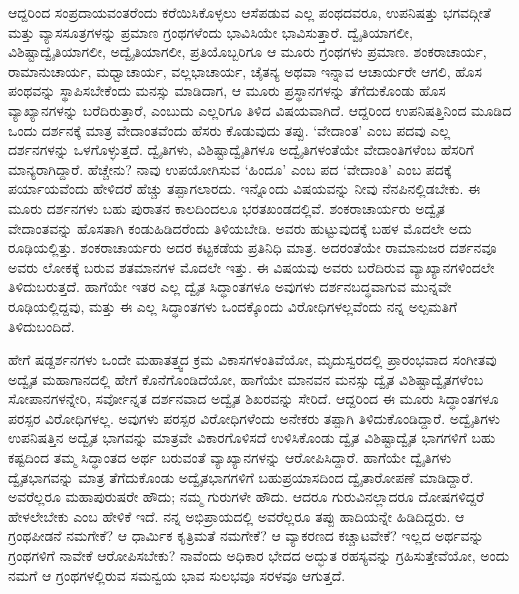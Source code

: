 ಆದ್ದರಿಂದ ಸಂಪ್ರದಾಯವಂತರೆಂದು ಕರೆಯಿಸಿಕೊಳ್ಳಲು ಆಸೆಪಡುವ ಎಲ್ಲ ಪಂಥದವರೂ, ಉಪನಿಷತ್ತು ಭಗವದ್ಗೀತೆ ಮತ್ತು ವ್ಯಾಸಸೂತ್ರಗಳನ್ನು ಪ್ರಮಾಣ ಗ್ರಂಥಗಳೆಂದು ಭಾವಿಸಿಯೇ ಭಾವಿಸುತ್ತಾರೆ. ದ್ವೈತಿಯಾಗಲೀ, ವಿಶಿಷ್ಟಾದ್ವೈತಿಯಾಗಲೀ, ಅದ್ವೈತಿಯಾಗಲೀ, ಪ್ರತಿಯೊಬ್ಬರಿಗೂ ಆ ಮೂರು ಗ್ರಂಥಗಳು ಪ್ರಮಾಣ. ಶಂಕರಾಚಾರ್ಯ, ರಾಮಾನುಚಾರ್ಯ, ಮಧ್ವಾಚಾರ್ಯ, ವಲ್ಲಭಾಚಾರ್ಯ, ಚೈತನ್ಯ ಅಥವಾ ಇನ್ನಾವ ಆಚಾರ್ಯರೇ ಆಗಲಿ, ಹೊಸ ಪಂಥವನ್ನು ಸ್ಥಾಪಿಸಬೇಕೆಂದು ಮನಸ್ಸು ಮಾಡಿದಾಗ, ಆ ಮೂರು ಪ್ರಸ್ಥಾನಗಳನ್ನು ತೆಗೆದುಕೊಂಡು ಹೊಸ ವ್ಯಾಖ್ಯಾನಗಳನ್ನು ಬರೆದಿರುತ್ತಾರೆ, ಎಂಬುದು ಎಲ್ಲರಿಗೂ ತಿಳಿದ ವಿಷಯವಾಗಿದೆ. ಆದ್ದರಿಂದ ಉಪನಿಷತ್ತಿನಿಂದ ಮೂಡಿದ ಒಂದು ದರ್ಶನಕ್ಕೆ ಮಾತ್ರ ವೇದಾಂತವೆಂದು ಹೆಸರು ಕೊಡುವುದು ತಪ್ಪು. ‘ವೇದಾಂತ’ ಎಂಬ ಪದವು ಎಲ್ಲ ದರ್ಶನಗಳನ್ನು ಒಳಗೊಳ್ಳುತ್ತದೆ. ದ್ವೈತಿಗಳು, ವಿಶಿಷ್ಟಾದ್ವೈತಿಗಳೂ ಅದ್ವೈತಿಗಳಂತೆಯೇ ವೇದಾಂತಿಗಳೆಂಬ ಹೆಸರಿಗೆ ಮಾನ್ಯರಾಗಿದ್ದಾರೆ. ಹೆಚ್ಚೇನು? ನಾವು ಉಪಯೋಗಿಸುವ ‘ಹಿಂದೂ’ ಎಂಬ ಪದ ‘ವೇದಾಂತಿ’ ಎಂಬ ಪದಕ್ಕೆ ಪರ್ಯಾಯವೆಂದು ಹೇಳಿದರೆ ಹೆಚ್ಚು ತಪ್ಪಾಗಲಾರದು. ಇನ್ನೊಂದು ವಿಷಯವನ್ನು ನೀವು ನೆನಪಿನಲ್ಲಿಡಬೇಕು. ಈ ಮೂರು ದರ್ಶನಗಳು ಬಹು ಪುರಾತನ ಕಾಲದಿಂದಲೂ ಭರತಖಂಡದಲ್ಲಿವೆ. ಶಂಕರಾಚಾರ್ಯರು ಅದ್ವೈತ ವೇದಾಂತವನ್ನು ಹೊಸತಾಗಿ ಕಂಡುಹಿಡಿದರೆಂದು ತಿಳಿಯಬೇಡಿ. ಅವರು ಹುಟ್ಟುವುದಕ್ಕೆ ಬಹಳ ಮೊದಲೇ ಅದು ರೂಢಿಯಲ್ಲಿತ್ತು. ಶಂಕರಾಚಾರ್ಯರು ಅದರ ಕಟ್ಟಕಡೆಯ ಪ್ರತಿನಿಧಿ ಮಾತ್ರ. ಅದರಂತೆಯೇ ರಾಮಾನುಜರ ದರ್ಶನವೂ ಅವರು ಲೋಕಕ್ಕೆ ಬರುವ ಶತಮಾನಗಳ ಮೊದಲೇ ಇತ್ತು. ಈ ವಿಷಯವು ಅವರು ಬರೆದಿರುವ ವ್ಯಾಖ್ಯಾನಗಳಿಂದಲೇ ತಿಳಿದುಬರುತ್ತದೆ. ಹಾಗೆಯೇ ಇತರ ಎಲ್ಲ ದ್ವೈತ ಸಿದ್ಧಾಂತಗಳೂ ಅವುಗಳು ದರ್ಶನಬದ್ಧವಾಗುವ ಮುನ್ನವೇ ರೂಢಿಯಲ್ಲಿದ್ದವು, ಮತ್ತು ಈ ಎಲ್ಲ ಸಿದ್ಧಾಂತಗಳು ಒಂದಕ್ಕೊಂದು ವಿರೋಧಿಗಳಲ್ಲವೆಂದು ನನ್ನ ಅಲ್ಪಮತಿಗೆ ತಿಳಿದುಬಂದಿದೆ.

ಹೇಗೆ ಷಡ್ದರ್ಶನಗಳು ಒಂದೇ ಮಹಾತತ್ತ್ವದ ಕ್ರಮ ವಿಕಾಸಗಳಂತಿವೆಯೋ, ಮೃದುಸ್ವರದಲ್ಲಿ ಪ್ರಾರಂಭವಾದ ಸಂಗೀತವು ಅದ್ವೈತ ಮಹಾಗಾನದಲ್ಲಿ ಹೇಗೆ ಕೊನೆಗೊಂಡಿದೆಯೋ, ಹಾಗೆಯೇ ಮಾನವನ ಮನಸ್ಸು ದ್ವೈತ ವಿಶಿಷ್ಟಾದ್ವೈತಗಳೆಂಬ ಸೋಪಾನಗಳನ್ನೇರಿ, ಸರ್ವೋನ್ನತ ದರ್ಶನವಾದ ಅದ್ವೈತ ಶಿಖರವನ್ನು ಸೇರಿದೆ. ಆದ್ದರಿಂದ ಈ ಮೂರು ಸಿದ್ಧಾಂತಗಳೂ ಪರಸ್ಪರ ವಿರೋಧಿಗಳಲ್ಲ. ಅವುಗಳು ಪರಸ್ಪರ ವಿರೋಧಿಗಳೆಂದು ಅನೇಕರು ತಪ್ಪಾಗಿ ತಿಳಿದುಕೊಂಡಿದ್ದಾರೆ. ಅದ್ವೈತಿಗಳು ಉಪನಿಷತ್ತಿನ ಅದ್ವೈತ ಭಾಗವನ್ನು ಮಾತ್ರವೇ ವಿಕಾರಗೊಳಿಸದೆ ಉಳಿಸಿಕೊಂಡು ದ್ವೈತ ವಿಶಿಷ್ಟಾದ್ವೈತ ಭಾಗಗಳಿಗೆ ಬಹು ಕಷ್ಟದಿಂದ ತಮ್ಮ ಸಿದ್ಧಾಂತದ ಅರ್ಥ ಬರುವಂತೆ ವ್ಯಾಖ್ಯಾನಗಳನ್ನು ಆರೋಪಿಸಿದ್ದಾರೆ. ಹಾಗೆಯೇ ದ್ವೈತಿಗಳು ದ್ವೈತಭಾಗವನ್ನು ಮಾತ್ರ ತೆಗೆದುಕೊಂಡು ಅದ್ವೈತಭಾಗಗಳಿಗೆ ಬಹುಪ್ರಯಾಸದಿಂದ ದ್ವೈತಾರೋಪಣೆ ಮಾಡಿದ್ದಾರೆ. ಅವರೆಲ್ಲರೂ ಮಹಾಪುರುಷರೇ ಹೌದು; ನಮ್ಮ ಗುರುಗಳೇ ಹೌದು. ಆದರೂ ಗುರುವಿನಲ್ಲಾದರೂ ದೋಷಗಳಿದ್ದರೆ ಹೇಳಲೇಬೇಕು ಎಂಬ ಹೇಳಿಕೆ ಇದೆ. ನನ್ನ ಅಭಿಪ್ರಾಯದಲ್ಲಿ ಅವರೆಲ್ಲರೂ ತಪ್ಪು ಹಾದಿಯನ್ನೇ ಹಿಡಿದಿದ್ದರು. ಆ ಗ್ರಂಥಪೀಡನೆ ನಮಗೇಕೆ? ಆ ಧಾರ್ಮಿಕ ಕೃತ್ರಿಮತೆ ನಮಗೇಕೆ? ಆ ವ್ಯಾಕರಣದ ಕಚ್ಚಾಟವೇಕೆ? ಇಲ್ಲದ ಅರ್ಥವನ್ನು ಗ್ರಂಥಗಳಿಗೆ ನಾವೇಕೆ ಆರೋಪಿಸಬೇಕು? ನಾವೆಂದು ಅಧಿಕಾರ ಭೇದದ ಅದ್ಭುತ ರಹಸ್ಯವನ್ನು ಗ್ರಹಿಸುತ್ತೇವೆಯೋ, ಅಂದು ನಮಗೆ ಆ ಗ್ರಂಥಗಳಲ್ಲಿರುವ ಸಮನ್ವಯ ಭಾವ ಸುಲಭವೂ ಸರಳವೂ ಆಗುತ್ತದೆ.

